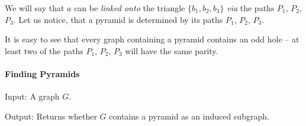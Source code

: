 We will say that $a$ can be \emph{linked onto} the triangle $\{b_1, b_2, b_3\}$ \emph{via} the paths $P_1$, $P_2$, $P_3$. Let us notice, that a pyramid is determined by its paths $P_1$, $P_2$, $P_3$.

It is easy to see that every graph containing a pyramid contains an odd hole -- at least two of the paths $P_1$, $P_2$, $P_3$ will have the same parity.

\paragraph{Finding Pyramids}
\begin{alg}
	\label{alg:testPyramid}
	Input: A graph $G$.

	\noindent Output: Returns whether $G$ contains a pyramid as an induced subgraph.
\end{alg}
